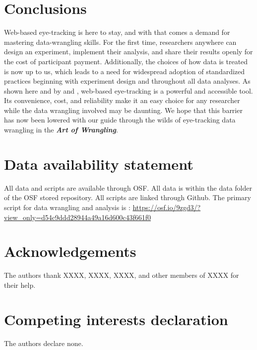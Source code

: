 \section{Conclusions}
Web-based eye-tracking is here to stay, and with that comes a demand for mastering data-wrangling skills. For the first time, researchers anywhere can design an experiment, implement their analysis, and share their results openly for the cost of participant payment. Additionally, the choices of how data is treated is now up to us, which leads to a need for widespread adoption of standardized practices beginning with experiment design and throughout all data analyses. As shown here and by \textcite{Prystauka_Altmann_Rothman_2023} and \textcite{Vos_2017}, web-based eye-tracking is a powerful and accessible tool. Its convenience, cost, and reliability make it an easy choice for any researcher while the data wrangling involved may be daunting. We hope that this barrier has now been lowered with our guide through the wilds of eye-tracking data wrangling in the \textit{\textbf{Art of Wrangling}}.
 
\section{Data availability statement}
All data and scripts are available through OSF. All data is within the data folder of the OSF stored repository. All scripts are linked through Github. The primary script for data wrangling and analysis is : \url{https://osf.io/9zgd3/?view_only=d54c9ddd28944a49a16d600c43f661f0}

\section{Acknowledgements}
The authors thank XXXX, XXXX, XXXX, and other members of XXXX for their help. 

\section{Competing interests declaration}
The authors declare none.

